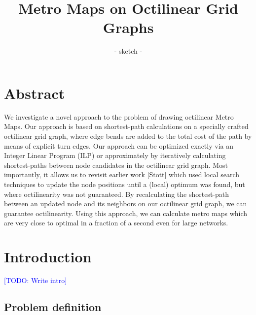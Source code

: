 \documentclass{sig-alternate-sigmod09}
\newcommand\TODO[1]{\textcolor{blue}{\small [TODO: #1]}}
\begin{document}
\title{Metro Maps on Octilinear Grid Graphs}
\subtitle{- sketch -}


\maketitle

\section{Abstract}

We investigate a novel approach to the problem of drawing octilinear Metro Maps.
Our approach is based on shortest-path calculations on a specially crafted octilinear grid graph, where edge bends are added to the total cost of the path by means of explicit turn edges.
Our approach can be optimized exactly via an Integer Linear Program (ILP) or approximately by iteratively calculating shortest-paths between node candidates in the octilinear grid graph.
Most importantly, it allows us to revisit earlier work [Stott] which used local search techniques to update the node positions until a (local) optimum was found, but where octilinearity was not guaranteed.
By recalculating the shortest-path between an updated node and its neighbors on our octilinear grid graph, we can guarantee octilinearity.
Using this approach, we can calculate metro maps which are very close to optimal in a fraction of a second even for large networks.

\section{Introduction}

\TODO{Write intro}

\subsection{Problem definition}
\end{document}
